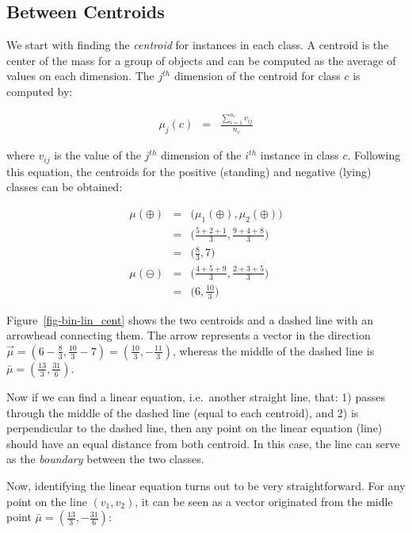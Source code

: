 \documentclass[
  letterpaper,
]{scrbook}
\begin{document}
\subsection{Between Centroids}\label{between-centroids}

We start with finding the \emph{centroid} for instances in each class. A
centroid is the center of the mass for a group of objects and can be
computed as the average of values on each dimension. The \(j^{th}\)
dimension of the centroid for class \(c\) is computed by:

\[\begin{aligned}
  \mu_{j}(c) & = & \frac{\sum_{i=1}^{n_c} v_{ij}}{n_c}
\end{aligned}\]

where \(v_{ij}\) is the value of the \(j^{th}\) dimension of the
\(i^{th}\) instance in class \(c\). Following this equation, the
centroids for the positive (standing) and negative (lying) classes can
be obtained:

\[\begin{aligned}
  \mu(\oplus)
  & = & \big( \mu_1(\oplus), \mu_2(\oplus) \big) \\
  & = & \big( \frac{5+2+1}{3}, \frac{9+4+8}{3} \big) \\
  & = & \big( \frac{8}{3}, 7 \big) \\
  \mu(\ominus)
  & = & \big( \frac{4+5+9}{3}, \frac{2+3+5}{3} \big) \\
  & = & \big( 6, \frac{10}{3} \big)
\end{aligned}\]

Figure~\ref{fig-bin-lin_cent} shows the two centroids and a dashed line
with an arrowhead connecting them. The arrow represents a vector in the
direction
\(\vec{\mu} = (6-\frac{8}{3}, \frac{10}{3} - 7) = (\frac{10}{3}, - \frac{11}{3})\),
whereas the middle of the dashed line is
\(\bar{\mu} = (\frac{13}{3}, \frac{31}{6})\).

Now if we can find a linear equation, i.e.~another straight line, that:
1) passes through the middle of the dashed line (equal to each
centroid), and 2) is perpendicular to the dashed line, then any point on
the linear equation (line) should have an equal distance from both
centroid. In this case, the line can serve as the \emph{boundary}
between the two classes.

Now, identifying the linear equation turns out to be very
straightforward. For any point on the line \((v_1, v_2)\), it can be
seen as a vector originated from the midle point
\(\bar{\mu} = (\frac{13}{3}, - \frac{31}{6})\):
\end{document}
